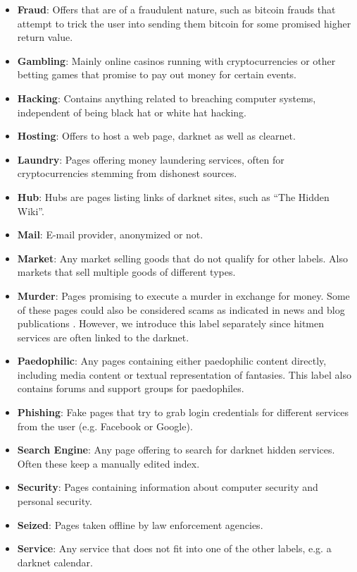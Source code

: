\begin{itemize}
	\item \textbf{Fraud}: Offers that are of a fraudulent nature, such as bitcoin frauds that attempt to trick the user into sending them bitcoin for some promised higher return value.
	\item \textbf{Gambling}: Mainly online casinos running with cryptocurrencies or other betting games that promise to pay out money for certain events.
	\item \textbf{Hacking}: Contains anything related to breaching computer systems, independent of being black hat or white hat hacking.
	\item \textbf{Hosting}: Offers to host a web page, darknet as well as clearnet.
	\item \textbf{Laundry}: Pages offering money laundering services, often for cryptocurrencies stemming from dishonest sources.
	\item \textbf{Hub}: Hubs are pages listing links of darknet sites, such as ``The Hidden Wiki''.
	\item \textbf{Mail}: E-mail provider, anonymized or not.
	\item \textbf{Market}: Any market selling goods that do not qualify for other labels. Also markets that sell multiple goods of different types.
	\item \textbf{Murder}: Pages promising to execute a murder in exchange for money. Some of these pages could also be considered scams as indicated in news and blog publications \cite{Monteiro}. However, we introduce this label separately since hitmen services are often linked to the darknet.
	\item \textbf{Paedophilic}: Any pages containing either paedophilic content directly, including media content or textual representation of fantasies. This label also contains forums and support groups for paedophiles.
	\item \textbf{Phishing}: Fake pages that try to grab login credentials for different services from the user (e.g. Facebook or Google).
	\item \textbf{Search Engine}: Any page offering to search for darknet hidden services. Often these keep a manually edited index.
	\item \textbf{Security}: Pages containing information about computer security and personal security.
	\item \textbf{Seized}: Pages taken offline by law enforcement agencies.
	\item \textbf{Service}: Any service that does not fit into one of the other labels, e.g. a darknet calendar.

\end{itemize}
